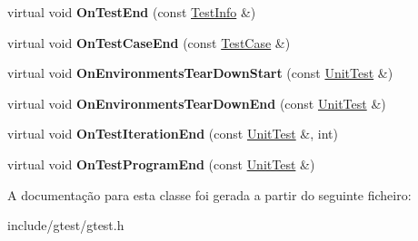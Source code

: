 \begin{DoxyCompactItemize}
\item 
\hypertarget{classtesting_1_1EmptyTestEventListener_afd58d21005f0d0d0399fb114627545d3}{virtual void {\bfseries On\-Test\-End} (const \hyperlink{classtesting_1_1TestInfo}{Test\-Info} \&)}\label{classtesting_1_1EmptyTestEventListener_afd58d21005f0d0d0399fb114627545d3}

\item 
\hypertarget{classtesting_1_1EmptyTestEventListener_a6bec703158283104c4298f7d8a528515}{virtual void {\bfseries On\-Test\-Case\-End} (const \hyperlink{classtesting_1_1TestCase}{Test\-Case} \&)}\label{classtesting_1_1EmptyTestEventListener_a6bec703158283104c4298f7d8a528515}

\item 
\hypertarget{classtesting_1_1EmptyTestEventListener_a00fa1a4ea5831e20746188414268e7c6}{virtual void {\bfseries On\-Environments\-Tear\-Down\-Start} (const \hyperlink{classtesting_1_1UnitTest}{Unit\-Test} \&)}\label{classtesting_1_1EmptyTestEventListener_a00fa1a4ea5831e20746188414268e7c6}

\item 
\hypertarget{classtesting_1_1EmptyTestEventListener_aea64c83c415b33a4c0b0239bafd1438d}{virtual void {\bfseries On\-Environments\-Tear\-Down\-End} (const \hyperlink{classtesting_1_1UnitTest}{Unit\-Test} \&)}\label{classtesting_1_1EmptyTestEventListener_aea64c83c415b33a4c0b0239bafd1438d}

\item 
\hypertarget{classtesting_1_1EmptyTestEventListener_a2253e5a18b3cf7bccd349567a252209d}{virtual void {\bfseries On\-Test\-Iteration\-End} (const \hyperlink{classtesting_1_1UnitTest}{Unit\-Test} \&, int)}\label{classtesting_1_1EmptyTestEventListener_a2253e5a18b3cf7bccd349567a252209d}

\item 
\hypertarget{classtesting_1_1EmptyTestEventListener_a0abcc02bd2331a2e29ad6f4d9daf2a32}{virtual void {\bfseries On\-Test\-Program\-End} (const \hyperlink{classtesting_1_1UnitTest}{Unit\-Test} \&)}\label{classtesting_1_1EmptyTestEventListener_a0abcc02bd2331a2e29ad6f4d9daf2a32}

\end{DoxyCompactItemize}


A documentação para esta classe foi gerada a partir do seguinte ficheiro\-:\begin{DoxyCompactItemize}
\item 
include/gtest/gtest.\-h\end{DoxyCompactItemize}
